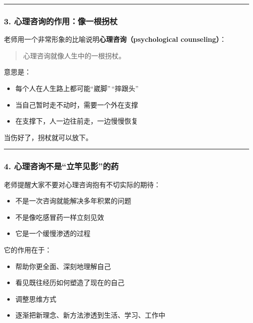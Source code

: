 \documentclass[
  chinese,
  9pt,
  a4paper,
]{ctexart}
\providecommand{\tightlist}{%
  \setlength{\itemsep}{0pt}\setlength{\parskip}{0pt}}
\begin{document}
\begin{center}\rule{0.5\linewidth}{0.5pt}\end{center}

\subsubsection{3.
心理咨询的作用：像一根拐杖}\label{ux5fc3ux7406ux54a8ux8be2ux7684ux4f5cux7528ux50cfux4e00ux6839ux62d0ux6756}

老师用一个非常形象的比喻说明\textbf{心理咨询（psychological
counseling）}：

\begin{quote}
心理咨询就像人生中的一根拐杖。
\end{quote}

意思是：

\begin{itemize}
\tightlist
\item
  每个人在人生路上都可能``崴脚''\,``摔跟头''
\item
  当自己暂时走不动时，需要一个外在支撑
\item
  在支撑下，人一边往前走，一边慢慢恢复
\end{itemize}

当伤好了，拐杖就可以放下。

\begin{center}\rule{0.5\linewidth}{0.5pt}\end{center}

\subsubsection{4.
心理咨询不是``立竿见影''的药}\label{ux5fc3ux7406ux54a8ux8be2ux4e0dux662fux7acbux7affux89c1ux5f71ux7684ux836f}

老师提醒大家不要对心理咨询抱有不切实际的期待：

\begin{itemize}
\tightlist
\item
  不是一次咨询就能解决多年积累的问题
\item
  不是像吃感冒药一样立刻见效
\item
  它是一个缓慢渗透的过程
\end{itemize}

它的作用在于：

\begin{itemize}
\tightlist
\item
  帮助你更全面、深刻地理解自己
\item
  看见既往经历如何塑造了现在的自己
\item
  调整思维方式
\item
  逐渐把新理念、新方法渗透到生活、学习、工作中
\end{itemize}
\end{document}
